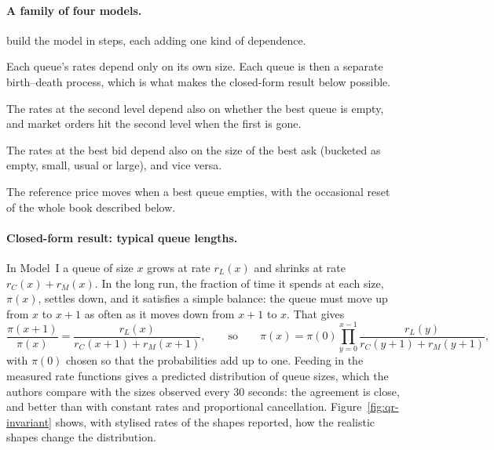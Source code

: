 \paragraph{A family of four models.} \citet{huang2015} build the model in steps, each adding one kind of
dependence.
\begin{description}[leftmargin=1.5em,style=nextline,itemsep=2pt]
\item[Model I: independent queues] Each queue's rates depend only on its own size. Each queue is then a
  separate birth--death process, which is what makes the closed-form result below possible.
\item[Model IIa: the second level watches the first] The rates at the second level depend also on whether
  the best queue is empty, and market orders hit the second level when the first is gone.
\item[Model IIb: the two sides watch each other] The rates at the best bid depend also on the size of the
  best ask (bucketed as empty, small, usual or large), and vice versa.
\item[Model III: prices] The reference price moves when a best queue empties, with the occasional reset of
  the whole book described below.
\end{description}

\paragraph{Closed-form result: typical queue lengths.} In Model~I a queue of size $x$
grows at rate $r_L(x)$ and shrinks at rate $r_C(x) + r_M(x)$. In the long run, the fraction of time it
spends at each size, $\pi(x)$, settles down, and it satisfies a simple balance: the queue must move up
from $x$ to $x+1$ as often as it moves down from $x+1$ to $x$. That gives
\begin{equation}
  \frac{\pi(x+1)}{\pi(x)} = \frac{r_L(x)}{r_C(x+1) + r_M(x+1)},
  \qquad\text{so}\qquad
  \pi(x) = \pi(0)\prod_{y=0}^{x-1}\frac{r_L(y)}{r_C(y+1) + r_M(y+1)} ,
\end{equation}
with $\pi(0)$ chosen so that the probabilities add up to one.
Feeding in the measured rate functions gives a predicted distribution of queue sizes, which the authors
compare with the sizes observed every 30 seconds: the agreement is close, and better than with constant
rates and proportional cancellation. Figure~\ref{fig:qr-invariant} shows, with stylised rates of the shapes
reported, how the realistic shapes change the distribution.

